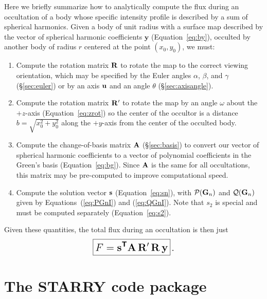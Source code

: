 \documentclass[modern]{aastex61}
\begin{document}
Here we briefly summarize how to analytically compute the flux during
an occultation of a body whose specific intensity profile is described
by a sum of spherical harmonics. Given a body of unit radius with a
surface map described by the vector of spherical harmonic coefficients
$\mathbf{y}$ (Equation~\ref{eq:by}), occulted by another body of radius $r$
centered at the point $(x_0, y_0)$, we must:
%
\begin{enumerate}
    \item Compute the rotation matrix ${\mathbf{R}}$ to rotate the map to the correct
          viewing orientation, which may be
          specified by the Euler angles $\alpha$, $\beta$, and $\gamma$
          (\S\ref{sec:euler}) or by an axis ${\mathbf{u}}$ and an angle $\theta$
          (\S\ref{sec:axisangle}).
    \item Compute the rotation matrix ${\mathbf{R'}}$ to rotate the map
          by an angle $\omega$ about the $+z$-axis
          (Equation~\ref{eq:zrot}) so the center of the occultor is a
          distance $b = \sqrt{x_0^2 + y_0^2}$ along the $+y$-axis
          from the center of the occulted body.
    \item Compute the change-of-basis matrix ${\mathbf{A}}$ (\S\ref{sec:basis}) to
          convert our vector of spherical harmonic coefficients to a vector
          of polynomial coefficients in the Green's basis
          (Equation~\ref{eq:bg}). Since ${\mathbf{A}}$ is the same for all
          occultations, this matrix may be pre-computed to improve
          computational speed.
    \item Compute the solution vector ${\mathbf{s}}$ (Equation~\ref{eq:sn}), with
          $\mathcal{P}({\mathbf{G}}_n)$ and $\mathcal{Q}({\mathbf{G}}_n)$ given by
          Equations~(\ref{eq:PGnI}) and (\ref{eq:QGnI}). Note that $s_2$
          is special and must be computed separately (Equation~\ref{eq:s2}).
\end{enumerate}
%
Given these quantities, the total flux during an occultation is then just
%
\begin{equation}
    \label{eq:starry}
    \boxed{
        \Large
        F = \bvec{s}^{\boldsymbol{\mathsf{T}}} \bvec{A} \, \bvec{R'} \, \bvec{R} \, \bvec{y}
        }
    \quad.
\end{equation}


\pagebreak
\section{The \textbf{STARRY} code package}
\label{sec:starrycode}
\end{document}
